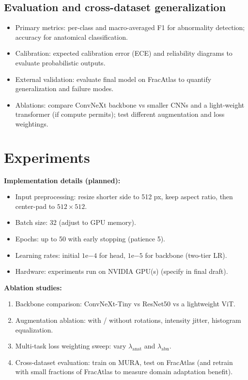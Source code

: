 \documentclass[conference]{IEEEtran}
\begin{document}
\subsection{Evaluation and cross-dataset generalization}
\begin{itemize}
  \item Primary metrics: per-class and macro-averaged F1 for abnormality detection; accuracy for anatomical classification.
  \item Calibration: expected calibration error (ECE) and reliability diagrams to evaluate probabilistic outputs.
  \item External validation: evaluate final model on FracAtlas to quantify generalization and failure modes.
  \item Ablations: compare ConvNeXt backbone vs smaller CNNs and a light-weight transformer (if compute permits); test different augmentation and loss weightings.
\end{itemize}

\section{Experiments}
\textbf{Implementation details (planned):}
\begin{itemize}
  \item Input preprocessing: resize shorter side to 512 px, keep aspect ratio, then center-pad to $512\times512$.
  \item Batch size: 32 (adjust to GPU memory).
  \item Epochs: up to 50 with early stopping (patience 5).
  \item Learning rates: initial $1\mathrm{e}{-4}$ for head, $1\mathrm{e}{-5}$ for backbone (two-tier LR).
  \item Hardware: experiments run on NVIDIA GPU(s) (specify in final draft).
\end{itemize}

\textbf{Ablation studies:}
\begin{enumerate}
  \item Backbone comparison: ConvNeXt-Tiny vs ResNet50 vs a lightweight ViT.
  \item Augmentation ablation: with / without rotations, intensity jitter, histogram equalization.
  \item Multi-task loss weighting sweep: vary $\lambda_{\text{anat}}$ and $\lambda_{\text{abn}}$.
  \item Cross-dataset evaluation: train on MURA, test on FracAtlas (and retrain with small fractions of FracAtlas to measure domain adaptation benefit).
\end{enumerate}
\end{document}
